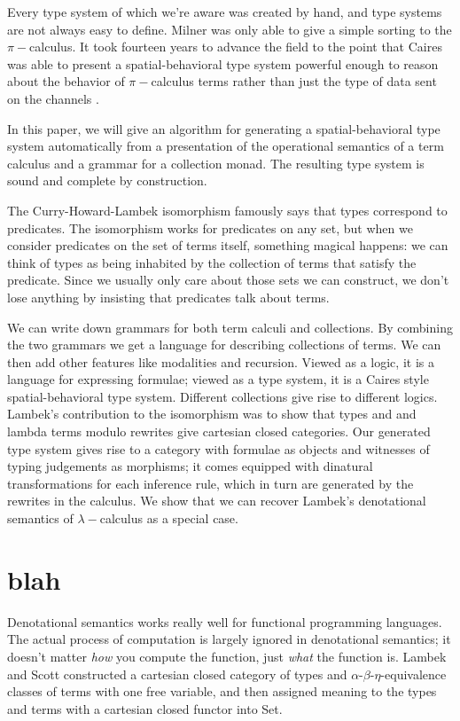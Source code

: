 \documentclass[a4paper,UKenglish]{article}
\begin{document}
Every type system of which we're aware was created by hand, and type systems are not always easy to define.  Milner \cite{Milner}
was only able to give a simple sorting to the $\pi-$calculus.  It took fourteen years to advance the field to the point that Caires was able to present a spatial-behavioral type system powerful enough to reason about the behavior of $\pi-$calculus terms rather than just the type of data sent on the channels \cite{Caires}.

In this paper, we will give an algorithm for generating a spatial-behavioral type system automatically from a presentation of the operational semantics of a term calculus and a grammar for a collection monad.  The resulting type system is sound and complete by construction.

The Curry-Howard-Lambek isomorphism famously says that types correspond to predicates.  The isomorphism works for predicates on any set, but when we consider predicates on the set of terms itself, something magical happens: we can think of types as being inhabited by the collection of terms that satisfy the predicate.  Since we usually only care about those sets we can construct, we don't lose anything by insisting that predicates talk about terms.

We can write down grammars for both term calculi and collections. By combining the two grammars we get a language for describing collections of terms.  We can then add other features like modalities and recursion.  Viewed as a logic, it is a language for expressing formulae; viewed as a type system, it is a Caires style spatial-behavioral type system.  Different collections give rise to different logics.  Lambek's contribution to the isomorphism was to show that types and and lambda terms modulo rewrites give cartesian closed categories.  Our generated type system gives rise to a category with formulae as objects and witnesses of typing judgements as morphisms; it comes equipped with dinatural transformations for each inference rule, which in turn are generated by the rewrites in the calculus.  We show that we can recover Lambek's denotational semantics of $\lambda-$calculus as a special case.

\section {blah}


Denotational semantics works really well for functional programming languages.  The actual process of computation is largely ignored in denotational semantics; it doesn't matter {\em how} you compute the function, just {\em what} the function is.  Lambek and Scott \cite{LambekScott} constructed a cartesian closed category of types and $\alpha$-$\beta$-$\eta$-equivalence classes of terms with one free variable, and then assigned meaning to the types and terms with a cartesian closed functor into Set.
\end{document}
